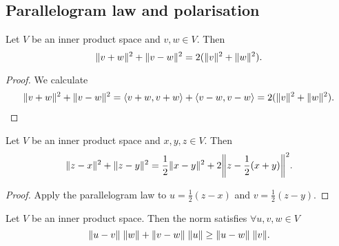 \subsection{Parallelogram law and polarisation}
\begin{theorem} \label{parallelogramLaw}
Let $V$ be an inner product space and $v,w\in V$. Then
\[ \lVert v+w\rVert^2 + \lVert v-w\rVert^2 = 2 (\lVert v\rVert^2+\lVert w\rVert^2). \]
\end{theorem}
\begin{proof}
We calculate
\begin{align*}
\lVert v+w\rVert^2 + \lVert v-w\rVert^2 = \left\langle v+w, v+w \right\rangle+\left\langle v-w,v-w \right\rangle = 2(\lVert v\rVert^2 + \lVert w\rVert^2).
\end{align*}
\end{proof}
\begin{corollary} \label{AppoloniusIdentity}
Let $V$ be an inner product space and $x,y,z\in V$. Then
\[ \norm{z-x}^2 + \norm{z-y}^2 = \frac{1}{2}\norm{x-y}^2 + 2\norm*{z-\frac{1}{2}(x+y)}^2. \]
\end{corollary}
\begin{proof}
Apply the parallelogram law to $u = \frac{1}{2}(z-x)$ and $v = \frac{1}{2}(z-y)$.
\end{proof}

\begin{proposition} \label{PtolemyInequality}
Let $V$ be an inner product space. Then the norm satisfies $\forall u,v,w\in V$
\[ \lVert u-v\rVert\;\lVert w\rVert + \lVert v-w\rVert\;\lVert u\rVert \geq \lVert u-w\rVert\;\lVert v\rVert. \]
\end{proposition}

